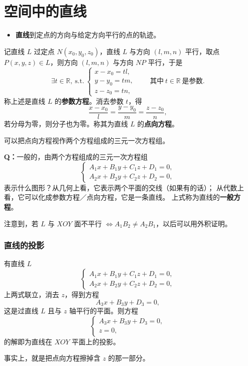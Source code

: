 \documentclass[UTF8,11pt]{ctexart}
\theoremstyle{cnthm}
\begin{document}
\section{空间中的直线}

\begin{itemize}
\item \textbf{直线}\quad 到定点的方向与给定方向平行的点的轨迹。
\end{itemize}

记直线 $L$ 过定点 $N(x_0,y_0,z_0)$，直线 $L$ 与方向
$(l,m,n)$ 平行，取点 $P(x,y,z)\in L$，则方向 $(l,m,n)$
与方向 $NP$ 平行，于是
\[
\exists t\in\mathbb R,\ \text{s.t.}\
\begin{cases}
x-x_0=tl,\\
y-y_0=tm,\\
z-z_0=tn,
\end{cases}
\qquad\text{其中}\ t\in\mathbb R\ \text{是参数} .
\]
称上述是直线 $L$ 的\textbf{参数方程}。消去参数 $t$，得
\[
\frac{x-x_0}{l}=\frac{y-y_0}{m}=\frac{z-z_0}{n},
\]
若分母为零，则分子也为零。称其为直线 $L$ 的\textbf{点向方程}。

可以把点向方程视作两个方程组成的三元一次方程组。

\textbf{Q：}\quad 一般的，由两个方程组成的三元一次方程组
\[
\begin{cases}
A_1x+B_1y+C_1z+D_1=0,\\
A_2x+B_2y+C_2z+D_2=0,
\end{cases}
\]
表示什么图形？从几何上看，它表示两个平面的交线（如果有的话）；
从代数上看，它可以化成参数方程／点向方程，它是一条直线。
上式称为直线的\textbf{一般方程}。

注意到，若 $L$ 与 $XOY$ 面不平行
$\Longleftrightarrow A_1B_2\neq A_2B_1$，以后可以用外积证明。

\subsubsection*{直线的投影}

有直线 $L$
\[
\begin{cases}
A_1x+B_1y+C_1z+D_1=0,\\
A_2x+B_2y+C_2z+D_2=0,
\end{cases}
\]
上两式联立，消去 $z$，得到方程
\[
A_3x+B_3y+D_3=0,
\]
这是过直线 $L$ 且与 $z$ 轴平行的平面。则方程
\[
\begin{cases}
A_3x+B_3y+D_3=0,\\
z=0,
\end{cases}
\]
的解即为直线在 $XOY$ 平面上的投影。

事实上，就是把点向方程擦掉含 $z$ 的那一部分。
\end{document}

